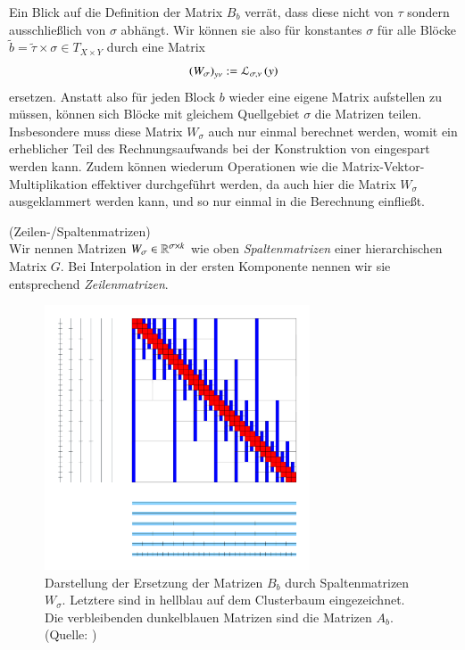     Ein Blick auf die Definition der Matrix $B_b$ verrät, dass diese nicht von $\tau$ sondern ausschließlich von $\sigma$ abhängt. Wir können sie also für konstantes $\sigma$ für alle Blöcke 
    $\tilde b = \tilde \tau \times \sigma \in T_{X \times Y}$ durch eine Matrix
    \begin{equation*}
      \left(W_\sigma\right)_{y\nu} := \mathcal{L}_{\sigma, \nu}\left(y\right)
    \end{equation*} 
    ersetzen. Anstatt also für jeden Block $b$ wieder eine eigene Matrix aufstellen zu müssen, können sich Blöcke mit gleichem Quellgebiet $\sigma$ die Matrizen teilen. Insbesondere muss diese 
    Matrix $W_\sigma$ auch nur einmal berechnet werden, womit ein erheblicher Teil des Rechnungsaufwands bei der Konstruktion von \hmat eingespart werden kann. Zudem können wiederum Operationen
    wie die Matrix-Vektor-Multiplikation effektiver durchgeführt werden, da auch hier die Matrix $W_\sigma$ ausgeklammert werden kann, und so nur einmal in die Berechnung einfließt. \citep{nichtlokop}
    
    \begin{defn}
      (Zeilen-/Spaltenmatrizen)\\
      Wir nennen Matrizen $W_\sigma \in \mathbb{R}^{\sigma \times k}$ wie oben \textit{Spaltenmatrizen} einer hierarchischen Matrix $G$. Bei Interpolation in der ersten Komponente nennen wir sie 
      entsprechend \textit{Zeilenmatrizen}.
    \end{defn}
    
    \begin{figure}[t]
      \includegraphics[width=0.7\textwidth]{img/semi-h2-matrix.png}
      \caption{Darstellung der Ersetzung der Matrizen $B_b$ durch Spaltenmatrizen $W_\sigma$. Letztere sind in hellblau auf dem Clusterbaum eingezeichnet. Die verbleibenden dunkelblauen 
	       Matrizen sind die Matrizen $A_b$. (Quelle: \citet{h2slides})}
      \label{fig:semi-h2}
    \end{figure}

